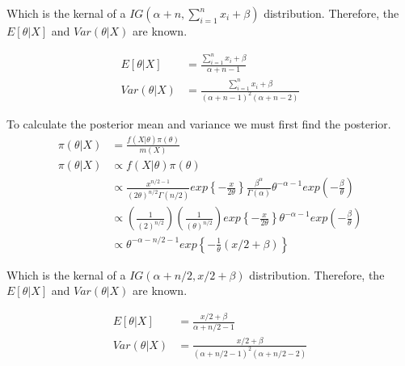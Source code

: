 \documentclass[11pt]{article}
\begin{document}
Which is the kernal of a $IG\left(\alpha+n,\sum \limits_{i=1}^n x_i+\beta \right)$ distribution.  Therefore, the $E[\theta|X]$ and $Var(\theta|X)$ are known.


\begin{align*}
E[\theta|X] &= \frac{\sum \limits_{i=1}^n x_i+\beta}{\alpha+n-1}  \tag{4.3} \\
Var(\theta|X) &= \frac{\sum \limits_{i=1}^n x_i+\beta}{(\alpha+n-1)^2(\alpha+n-2)}  \tag{4.4}
\end{align*}

\item %

To calculate the posterior mean and variance we must first find the posterior. \\
\begin{align*}
\pi(\theta|X) &=\frac{ f(X| \theta) \pi (\theta)}{m(X)} \\
\pi(\theta|X) & \propto f(X| \theta) \pi (\theta) \\
& \propto \frac{x^{n/2-1}}{(2\theta)^{n/2} \Gamma(n/2)}exp\left\{-\frac{x}{2\theta} \right\}  \frac{\beta^\alpha}{\Gamma(\alpha)}\theta^{-\alpha-1} exp\left(-\frac{\beta}{\theta}\right) \\
& \propto \left(\frac{1}{(2)^{n/2}} \right) \left(\frac{1}{(\theta)^{n/2}} \right) exp\left\{-\frac{x}{2\theta} \right\} \theta^{-\alpha-1} exp\left(-\frac{\beta}{\theta}\right)  \\
& \propto  \theta^{-\alpha-n/2-1} exp\left\{-\frac{1}{\theta}\left(x/2+\beta \right) \right\}  
\end{align*}

Which is the kernal of a $IG\left(\alpha+n/2,x/2+\beta \right)$ distribution.  Therefore, the $E[\theta|X]$ and $Var(\theta|X)$ are known.


\begin{align*}
E[\theta|X] &= \frac{x/2+\beta}{\alpha+n/2-1}  \tag{4.5} \\
Var(\theta|X) &= \frac{x/2+\beta}{(\alpha+n/2-1)^2(\alpha+n/2-2)}  \tag{4.6}
\end{align*}
\end{document}

